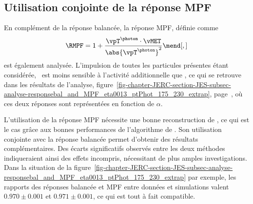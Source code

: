 \subsection{Utilisation conjointe de la réponse MPF}
En complément de la réponse balancée, la réponse MPF, définie comme
\begin{equation}
\RMPF = 1 + \frac{\vpT^{\photon}\cdot\vMET}{\abs{\vpT^{\photon}}^2}
\mend[,]
\end{equation}
est également analysée.
L'impulsion de toutes les particules présentes étant considérée, \RMPF\ est moins sensible à l'activité additionnelle que \Rbal, ce qui se retrouve dans les résultats de l'analyse, figure~\ref{fig-chapter-JERC-section-JES-subsec-analyse-responsebal_and_MPF_eta0013_ptPhot_175_230_extrap}, page~\pageref{fig-chapter-JERC-section-JES-subsec-analyse-responsebal_and_MPF_eta0013_ptPhot_175_230_extrap}, où ces deux réponses sont représentées en fonction de $\alpha$.
\par L'utilisation de la réponse MPF nécessite une bonne reconstruction de \vMET, ce qui est le cas grâce aux bonnes performances de l'algorithme de \PF.
Son utilisation conjointe avec la réponse balancée permet d'obtenir des résultats complémentaires.
Des écarts significatifs observés entre les deux méthodes indiqueraient ainsi des effets incompris, nécessitant de plus amples investigations.
Dans la situation de la figure~\ref{fig-chapter-JERC-section-JES-subsec-analyse-responsebal_and_MPF_eta0013_ptPhot_175_230_extrap} par exemple, les rapports des réponses balancée et MPF entre données et simulations valent
$\num{0.970}\pm\num{0.001}$
et
$\num{0.971}\pm\num{0.001}$,
ce qui est tout à fait compatible.
